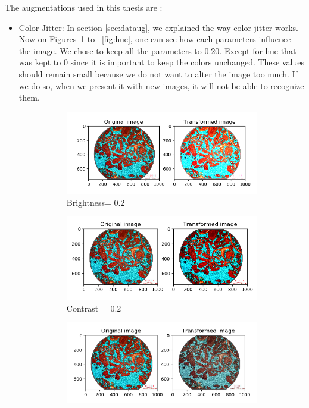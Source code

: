 The augmentations used in this thesis are :
\begin{itemize}
    \item Color Jitter: In section \ref{sec:dataug}, we explained the way color jitter works. Now on Figures~\ref{fig:brightness} to ~\ref{fig:hue}, one can see how each parameters influence the image.
    We chose to keep all the parameters to 0.20. Except for hue that was kept to 0 since it is important to keep the colors unchanged. These values should remain small because we do not want to alter the image too much. If we do so, when we present it with new images, it will not be able to recognize them. 

\begin{figure}
\begin{subfigure}{.5\textwidth}
  \centering
  \includegraphics[width=1\linewidth]{figures/03-bightness08.PNG}
  \caption{Brightness= 0.2}
  \label{fig:brightness}
\end{subfigure}%
\begin{subfigure}{.5\textwidth}
  \centering
  \includegraphics[width=1\linewidth]{figures/03-contrast1.PNG}
  \caption{Contrast = 0.2}
  \label{fig:contrast}
\end{subfigure}
\begin{subfigure}{.5\textwidth}
  \centering
  \includegraphics[width=1\linewidth]{figures/03-saturation0.PNG}

\end{subfigure}
\end{figure}
\end{itemize}
